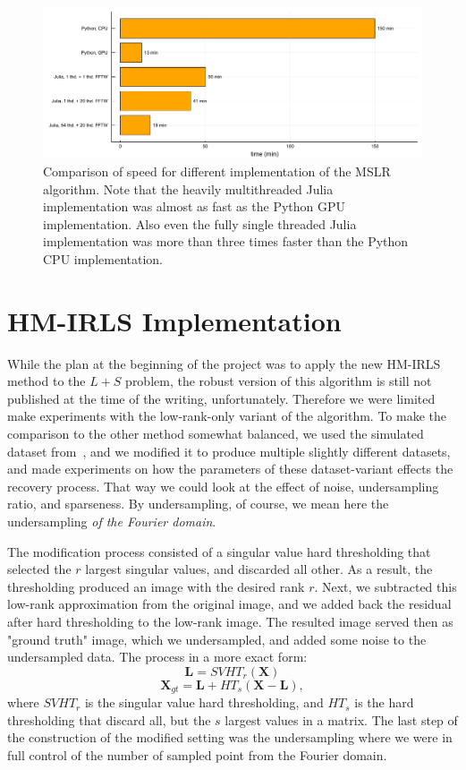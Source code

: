 \begin{figure}
    \centering
    \includegraphics[width=\linewidth]{images/MSLR_recon_speed.pdf}
    \caption{Comparison of speed for different implementation of the MSLR algorithm. Note that the heavily multithreaded Julia implementation was almost as fast as the Python GPU implementation. Also even the fully single threaded Julia implementation was more than three times faster than the Python CPU implementation.}
    \label{fig:MSLR_recon_speed}
\end{figure}


\section{HM-IRLS Implementation}

While the plan at the beginning of the project was to apply the new HM-IRLS method to the $L+S$ problem, the robust version of this algorithm is still not published at the time of the writing, unfortunately. Therefore we were limited make experiments with the low-rank-only variant of the algorithm. To make the comparison to the other method somewhat balanced, we used the simulated dataset from~\cite{wissmann_mrxcat_2014}, and we modified it to produce multiple slightly different datasets, and made experiments on how the parameters of these dataset-variant effects the recovery process. That way we could look at the effect of noise, undersampling ratio, and sparseness. By undersampling, of course, we mean here the undersampling \textit{of the Fourier domain}.

The modification process consisted of a singular value hard thresholding that selected the $r$ largest singular values, and discarded all other. As a result, the thresholding produced an image with the desired rank $r$. Next, we subtracted this low-rank approximation from the original image, and we added back the residual after hard thresholding to the low-rank image. The resulted image served then as "ground truth" image, which we undersampled, and added some noise to the undersampled data. The process in a more exact form:
\[\mathbf{L} = SVHT_r(\mathbf{X})\]
\[\mathbf{X}_{gt} = \mathbf{L} + HT_s(\mathbf{X} - \mathbf{L}),\]
where $SVHT_r$ is the singular value hard thresholding,
and $HT_s$ is the hard thresholding that discard all, but the $s$ largest values in a matrix. The last step of the construction of the modified setting was the undersampling where we were in full control of the number of sampled point from the Fourier domain.

